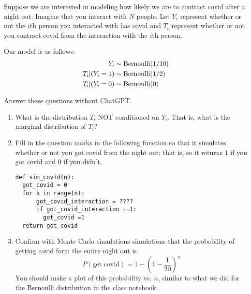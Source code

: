 \begin{exercise}
Suppose we are interested in modeling how likely we are to contract covid after a night out. Imagine that you interact with $N$ people. Let $Y_i$ represent whether or not the $i$th person you interacted with has covid and $T_i$ represent whether or not you contract covid from the interaction with the $i$th person. 

Our model is as follows:
\begin{align*}
Y_i &\sim {\rm Bernoulli}(1/10)\\
T_i |(Y_i=1) &\sim {\rm Bernoulli}(1/2)\\
T_i|(Y_i=0) &\sim {\rm Bernoulli}(0)
\end{align*}

Answer these questions without ChatGPT. 

\begin{enumerate}[label=(\alph*)]
\item What is the distribution $T_i$ NOT conditioned on $Y_i$.  That is, what is the marginal distribution of $T_i$?
\item Fill in the question marks in the following function so that it simulates whether or not you got covid from the night out; that is, so it returns $1$ if you got covid and $0$ if you didn't.
\begin{Verbatim}
def sim_covid(n):
  got_covid = 0
  for k in range(n):
      got_covid_interaction = ????
      if got_covid_interaction ==1:
        got_covid =1
  return got_covid
\end{Verbatim}
\item  Confirm with Monte Carlo simulations simulations that the probability of getting covid form the entire night out is
\begin{equation}
P(\text{get covid}) = 1-\left(1-\frac{1}{20}\right)^n
\end{equation}
You should make a plot of this probability vs. $n$, similar to what we did for the Bernoulli distribution in the class notebook.
\end{enumerate}
\end{exercise}







